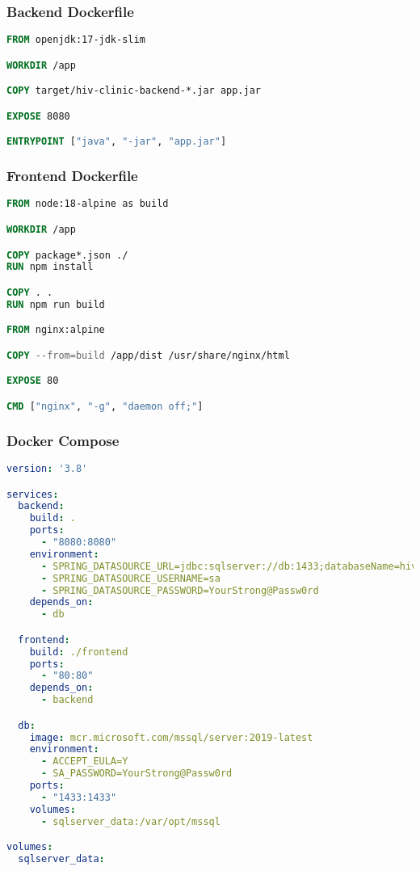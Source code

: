 \documentclass[12pt,a4paper]{article}
\begin{document}
\subsubsection{Backend Dockerfile}

\begin{lstlisting}[language=Dockerfile, caption=Backend Dockerfile]
FROM openjdk:17-jdk-slim

WORKDIR /app

COPY target/hiv-clinic-backend-*.jar app.jar

EXPOSE 8080

ENTRYPOINT ["java", "-jar", "app.jar"]
\end{lstlisting}

\subsubsection{Frontend Dockerfile}

\begin{lstlisting}[language=Dockerfile, caption=Frontend Dockerfile]
FROM node:18-alpine as build

WORKDIR /app

COPY package*.json ./
RUN npm install

COPY . .
RUN npm run build

FROM nginx:alpine

COPY --from=build /app/dist /usr/share/nginx/html

EXPOSE 80

CMD ["nginx", "-g", "daemon off;"]
\end{lstlisting}

\subsubsection{Docker Compose}

\begin{lstlisting}[language=YAML, caption=Docker Compose]
version: '3.8'

services:
  backend:
    build: .
    ports:
      - "8080:8080"
    environment:
      - SPRING_DATASOURCE_URL=jdbc:sqlserver://db:1433;databaseName=hiv_clinic
      - SPRING_DATASOURCE_USERNAME=sa
      - SPRING_DATASOURCE_PASSWORD=YourStrong@Passw0rd
    depends_on:
      - db

  frontend:
    build: ./frontend
    ports:
      - "80:80"
    depends_on:
      - backend

  db:
    image: mcr.microsoft.com/mssql/server:2019-latest
    environment:
      - ACCEPT_EULA=Y
      - SA_PASSWORD=YourStrong@Passw0rd
    ports:
      - "1433:1433"
    volumes:
      - sqlserver_data:/var/opt/mssql

volumes:
  sqlserver_data:
\end{lstlisting}
\end{document}
